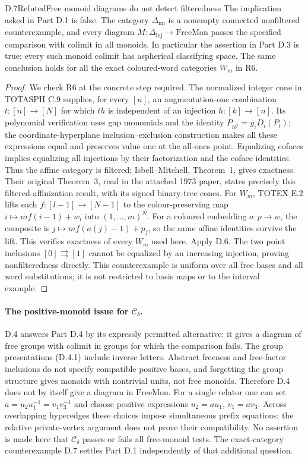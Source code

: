 \begin{claim}{D.7}{Refuted}{Free monoid diagrams do not detect filteredness}
\label{D:not-filtered}
The implication asked in Part D.1 is false. The category
$\Delta_{\mathrm{inj}}$ is a nonempty connected nonfiltered
counterexample, and every diagram
$M:\Delta_{\mathrm{inj}}\to\mathrm{FreeMon}$ passes the specified
comparison with colimit in all monoids. In particular the
assertion in Part D.3 is true: every such monoid colimit has
aspherical classifying space. The same conclusion holds for
all the exact coloured-word categories $W_m$ in R6.
\end{claim}
\begin{proof}
We check R6 at the concrete step required. The normalized
integer cone in TOTASPH C.9 supplies, for every $[n]$, an
augmentation-one combination $t:[n]\to[N]$ for which $th$ is
independent of an injection $h:[k]\to[n]$. Its polynomial
verification uses gap monomials and the identity
$P_{t\delta^i}=y_iD_i(P_t)$; the coordinate-hyperplane
inclusion--exclusion construction makes all these expressions
equal and preserves value one at the all-ones point. Equalizing
cofaces implies equalizing all injections by their factorization
and the coface identities. Thus the affine category is filtered;
Isbell--Mitchell, Theorem~1, gives exactness. Their original
Theorem~3, read in the attached 1973 paper, states precisely this
filtered-affinization result, with its signed binary-tree cones.
For $W_m$, TOTEX E.2 lifts each $f:[l-1]\to[N-1]$ to the
colour-preserving map $i\mapsto mf(i-1)+w_i$ into
$(1,\ldots,m)^N$. For a coloured embedding $a:p\to w$, the
composite is $j\mapsto mf(a(j)-1)+p_j$, so the same affine
identities survive the lift. This verifies exactness of every
$W_m$ used here. Apply D.6. The two
point inclusions $[0]\rightrightarrows[1]$ cannot be equalized
by an increasing injection, proving nonfilteredness directly.
This counterexample is uniform over all free bases and all
word substitutions; it is not restricted to basis maps or to
the interval example.
\end{proof}

\paragraph{The positive-monoid issue for $\mathcal C_\delta$.}
D.4 answers Part D.4 by its expressly permitted alternative:
it gives a diagram of free groups with colimit in groups for
which the comparison fails. The group presentations (D.4.1)
include inverse letters. Abstract freeness and free-factor
inclusions do not specify compatible positive bases, and
forgetting the group structure gives monoids with nontrivial
units, not free monoids. Therefore D.4 does not by itself
give a diagram in $\mathrm{FreeMon}$. For a single relator one
can set $a=u_2u_1^{-1}=v_1v_3^{-1}$ and choose positive
expressions $u_2=au_1$, $v_1=av_3$. Across overlapping
hyperedges these choices impose simultaneous prefix equations;
the relative private-vertex argument does not prove their
compatibility. No assertion is made here that
$\mathcal C_\delta$ passes or fails all free-monoid tests.
The exact-category counterexample D.7 settles Part D.1
independently of that additional question.


